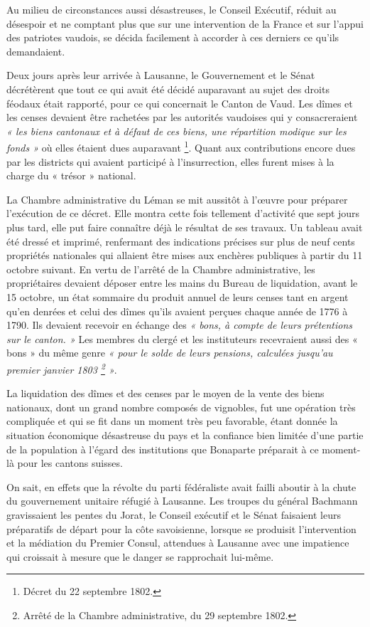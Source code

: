 \documentclass[french,twoside]{book} %
\begin{document}
Au milieu de circonstances aussi désastreuses, le Conseil Exécutif, réduit au désespoir et ne comptant plus que sur une intervention de la France et sur l’appui des patriotes vaudois, se décida facilement à accorder à ces derniers ce qu’ils demandaient.\par
Deux jours après leur arrivée à Lausanne, le Gouvernement et le Sénat décrétèrent que tout ce qui avait été décidé auparavant au sujet des droits féodaux était rapporté, pour ce qui concernait le Canton de Vaud. Les dîmes et les censes devaient être rachetées par les autorités vaudoises qui y consacreraient \emph{« les biens cantonaux et à défaut de ces biens, une répartition modique sur les fonds »} où elles étaient dues auparavant \footnote{Décret du 22 septembre 1802.}. Quant aux contributions encore dues par les districts qui avaient participé à l’insurrection, elles furent mises à la charge du « trésor » national.\par
La Chambre administrative du Léman se mit aussitôt à l’œuvre pour préparer l’exécution de ce décret. Elle montra cette fois tellement d’activité que sept jours plus tard, elle put faire connaître déjà le résultat de ses travaux. Un tableau avait été dressé et imprimé, renfermant des indications précises sur plus de neuf cents propriétés nationales qui allaient être mises aux enchères publiques à partir du 11 octobre suivant. En vertu de l’arrêté de la Chambre administrative, les propriétaires devaient déposer entre les mains du Bureau de liquidation, avant le 15 octobre, un état sommaire du produit annuel de leurs censes tant en argent qu’en denrées et celui des dîmes qu’ils avaient perçues chaque année de 1776 à 1790. Ils devaient recevoir en échange des \emph{« bons, à compte de leurs prétentions sur le canton. »} Les membres du clergé et les instituteurs recevraient aussi des « bons » du même genre \emph{« pour le solde de leurs pensions, calculées jusqu’au premier janvier 1803 \footnote{Arrêté de la Chambre administrative, du 29 septembre 1802.} »}.\par
La liquidation des dîmes et des censes par le moyen de la vente des biens nationaux, dont un grand nombre composés de vignobles, fut une opération très compliquée et qui se fit dans un moment très peu favorable, étant donnée la situation économique désastreuse du pays et la confiance bien limitée d’une partie de la population à l’égard des institutions que Bonaparte préparait à ce moment-là pour les cantons suisses.\par
On sait, en effets que la révolte du parti fédéraliste avait failli aboutir à la chute du gouvernement unitaire réfugié à Lausanne. Les troupes du général Bachmann gravissaient les pentes du Jorat, le Conseil exécutif et le Sénat faisaient leurs préparatifs de départ pour la côte savoisienne, lorsque se produisit l’intervention et la médiation du Premier Consul, attendues à Lausanne avec une impatience qui croissait à mesure que le danger se rapprochait lui-même.\par
\end{document}
